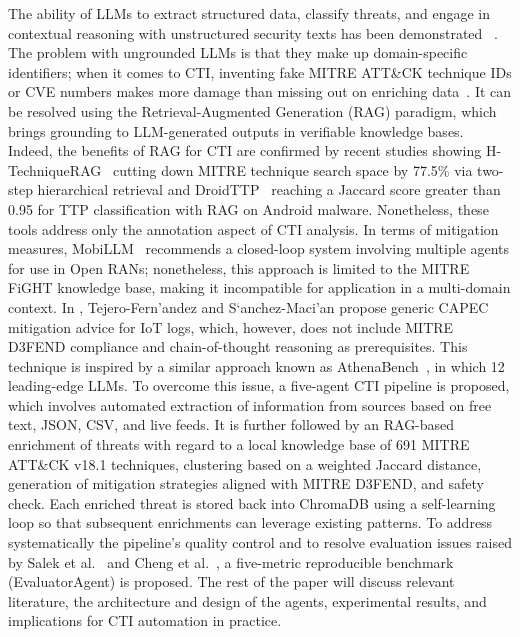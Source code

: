 \documentclass[conference]{IEEEtran}
\begin{document}
The ability of LLMs to extract structured data, classify threats, and engage in contextual reasoning with unstructured security texts has been demonstrated ~\cite{hmimou2025multi,patel2024canal}.
The problem with ungrounded LLMs is that they make up domain-specific identifiers; when it comes to CTI, inventing fake MITRE ATT&CK technique IDs or CVE numbers makes more damage than missing out on enriching data~\cite{morbiato2026hrag,iyer2026cyber}. It can be resolved using the Retrieval-Augmented Generation (RAG) paradigm, which brings grounding to LLM-generated outputs in verifiable knowledge bases. Indeed, the benefits of RAG for CTI are confirmed by recent studies showing H-TechniqueRAG~\cite{morbiato2026hrag} cutting down MITRE technique search space by 77.5\% via two-step hierarchical retrieval and DroidTTP~\cite{arikkat2025droid} reaching a Jaccard score greater than 0.95 for TTP classification with RAG on Android malware. Nonetheless, these tools address only the annotation aspect of CTI analysis.
In terms of mitigation measures, MobiLLM~\cite{sharma2025mobillm} recommends a closed-loop system involving multiple agents for use in Open RANs; nonetheless, this approach is limited to the MITRE FiGHT knowledge base, making it incompatible for application in a multi-domain context. In \cite{tejero2025iot}, Tejero-Fern’{a}ndez and S‘{a}nchez-Maci’{a}n propose generic CAPEC mitigation advice for IoT logs, which, however, does not include MITRE D3FEND compliance and chain-of-thought reasoning as prerequisites. This technique is inspired by a similar approach known as AthenaBench~\cite{alam2026athena}, in which 12 leading-edge LLMs.
To overcome this issue, a five-agent CTI pipeline is proposed, which involves automated extraction of information from sources based on free text, JSON, CSV, and live feeds. It is further followed by an RAG-based enrichment of threats with regard to a local knowledge base of 691 MITRE ATT&CK v18.1 techniques, clustering based on a weighted Jaccard distance, generation of mitigation strategies aligned with MITRE D3FEND, and safety check. Each enriched threat is stored back into ChromaDB using a self-learning loop so that subsequent enrichments can leverage existing patterns. To address systematically the pipeline's quality control and to resolve evaluation issues raised by Salek et al.~\cite{salek2025threat} and Cheng et al.~\cite{cheng2025ctiarena}, a five-metric reproducible benchmark (EvaluatorAgent) is proposed. The rest of the paper will discuss relevant literature, the architecture and design of the agents, experimental results, and implications for CTI automation in practice.
\end{document}
